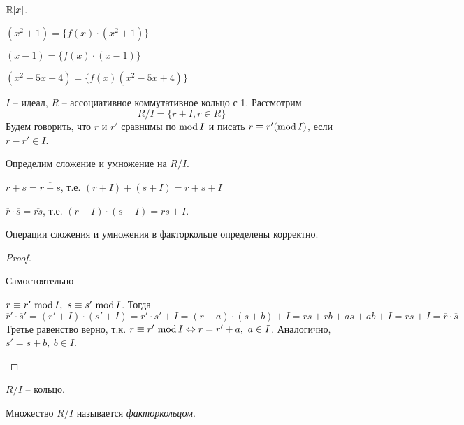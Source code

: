 \begin{Example}
	$\mathbb{R}[x]$. 
	\begin{MyItemize}
		\item $(x^2 + 1) = \{f(x) \cdot (x^2 + 1)\}$ 
		\item $(x - 1) = \{f(x) \cdot (x - 1)\}$ 
		\item $(x^2 - 5x + 4) = \{f(x) (x^2 - 5x + 4)\}$ 
	\end{MyItemize}  
\end{Example}

\begin{Def}
	$I$ -- идеал, $R$ -- ассоциативное коммутативное кольцо с 1. Рассмотрим 
	\[R/I = \{r + I, r \in R\}\]
	Будем говорить, что $r$ и $r'$ сравнимы по $\mathrm{mod}\, I$ и писать $r \equiv r' (\mathrm{mod}\, I)$, если $r - r' \in I$.  

	Определим сложение и умножение на $R/I$.
	\begin{MyList}
		\item $\overline{r} + \overline{s} = \overline{r + s}$, т.е. $(r + I) + (s + I) = r + s + I$
		\item $\overline{r} \cdot \overline{s} = \overline{rs}$, т.е. $(r + I) \cdot (s + I) = rs + I$.
	\end{MyList}
\end{Def}

\begin{Thm}
	Операции сложения и умножения в факторкольце определены корректно.
\end{Thm}

\begin{proof}
	\begin{MyList}
		\item Самостоятельно
		\item $r \equiv r' \ \mathrm{mod}\, I, \ s \equiv s' \ \mathrm{mod}\, I$.
		Тогда 
		\[\overline{r}' \cdot \overline{s}' = (r' + I) \cdot (s' + I) = r' \cdot s' + I = (r + a) \cdot (s + b) + I = rs + rb +  as + ab + I = rs + I = \overline{r} \cdot \overline{s}\]
		Третье равенство верно, т.к. $r \equiv r' \ \Mod I \EQ r = r' + a, \ a \in I$. Аналогично, $s' = s + b, \ b \in I$. 
	\end{MyList} 
\end{proof}

\begin{Thm}
	$R/I$ -- кольцо.
\end{Thm}

\begin{Def}[Факторкольцо]
	Множество $R/I$ называется \textit{факторкольцом}.
\end{Def}

